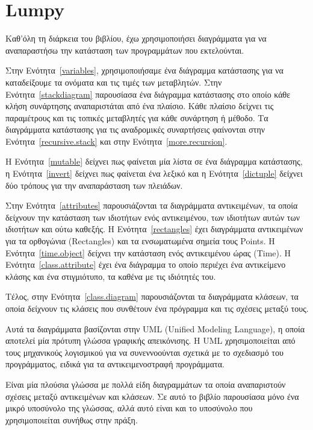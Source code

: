 \documentclass[10pt]{book}
\begin{document}
\chapter{Lumpy}
\label{lumpy}

 
Καθ'όλη τη διάρκεια του βιβλίου, έχω χρησιμοποιήσει διαγράμματα για να αναπαραστήσω την κατάσταση των προγραμμάτων που εκτελούνται.

Στην Ενότητα~\ref{variables}, χρησιμοποιήσαμε ένα διάγραμμα κατάστασης για να καταδείξουμε τα ονόματα και τις τιμές των μεταβλητών.  Στην Ενότητα~\ref{stackdiagram} παρουσίασα ένα διάγραμμα κατάστασης στο οποίο κάθε κλήση συνάρτησης αναπαριστάται από ένα πλαίσιο.  Κάθε πλαίσιο δείχνει τις παραμέτρους και 
τις τοπικές μεταβλητές για κάθε συνάρτηση ή μέθοδο.  Τα διαγράμματα κατάστασης για τις αναδρομικές συναρτήσεις φαίνονται στην Ενότητα~\ref{recursive.stack} και στην 
Ενότητα~\ref{more.recursion}.
 
 

Η Ενότητα~\ref{mutable} δείχνει πως φαίνεται μία λίστα σε ένα διάγραμμα κατάστασης, 
η Ενότητα~\ref{invert} δείχνει πως φαίνεται ένα λεξικό και η Ενότητα~\ref{dictuple} 
δείχνει δύο τρόπους για την αναπαράσταση των πλειάδων.

Στην Ενότητα~\ref{attributes} παρουσιάζονται τα διαγράμματα αντικειμένων, τα οποία 
δείχνουν την κατάσταση των ιδιοτήτων ενός αντικειμένου, των ιδιοτήτων αυτών των ιδιοτήτων και ούτω καθεξής.  Η Ενότητα~\ref{rectangles} έχει διαγράμματα αντικειμένων για τα ορθογώνια  (Rectangles)  και τα ενσωματωμένα σημεία τους  Points.   Η Ενότητα~\ref{time.object} δείχνει την κατάσταση ενός αντικειμένου ώρας  (Time). 
Η Ενότητα~\ref{class.attribute} έχει ένα διάγραμμα το οποίο περιέχει ένα αντικείμενο κλάσης και ένα στιγμιότυπο, τα καθένα με τις ιδιότητές του.

Τέλος, στην Ενότητα~\ref{class.diagram} παρουσιάζονται τα διαγράμματα κλάσεων, τα οποία δείχνουν τις κλάσεις που συνθέτουν ένα πρόγραμμα και τις σχέσεις μεταξύ τους.

Αυτά τα διαγράμματα βασίζονται στην  UML (Unified Modeling Language),  η οποία αποτελεί μία πρότυπη γλώσσα γραφικής απεικόνισης.  Η  UML  χρησιμοποιείται από τους μηχανικούς λογισμικού για να συνεννοούνται σχετικά με το σχεδιασμό του προγράμματος, ειδικά για τα αντικειμενοστραφή προγράμματα.

Είναι μία πλούσια γλώσσα με πολλά είδη διαγραμμάτων τα οποία αναπαριστούν σχέσεις 
μεταξύ αντικειμένων και κλάσεων.  Σε αυτό το βιβλίο παρουσίασα μόνο ένα μικρό υποσύνολο της γλώσσας, αλλά αυτό είναι και το υποσύνολο που χρησιμοποιείται συνήθως στην πράξη.
\end{document}

